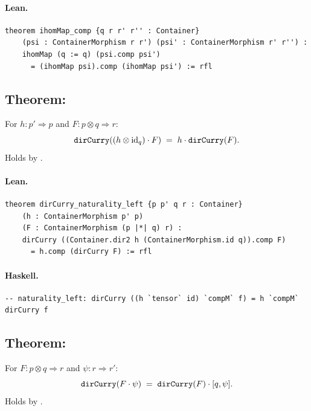 \documentclass[11pt,a4paper]{article}
\begin{document}
\paragraph{Lean.}
\begin{lstlisting}[style=lean]
theorem ihomMap_comp {q r r' r'' : Container}
    (psi : ContainerMorphism r r') (psi' : ContainerMorphism r' r'') :
    ihomMap (q := q) (psi.comp psi')
      = (ihomMap psi).comp (ihomMap psi') := rfl
\end{lstlisting}


\subsection{Theorem: }

\begin{thm}
For $h : p' \Rightarrow p$ and $F : p \otimes q \Rightarrow r$:
\[
  \texttt{dirCurry}((h \otimes \mathrm{id}_q) \cdot F)
  \;=\;
  h \cdot \texttt{dirCurry}(F).
\]
Holds by .
\end{thm}

\paragraph{Lean.}
\begin{lstlisting}[style=lean]
theorem dirCurry_naturality_left {p p' q r : Container}
    (h : ContainerMorphism p' p)
    (F : ContainerMorphism (p |*| q) r) :
    dirCurry ((Container.dir2 h (ContainerMorphism.id q)).comp F)
      = h.comp (dirCurry F) := rfl
\end{lstlisting}

\paragraph{Haskell.}
\begin{lstlisting}[style=haskell]
-- naturality_left: dirCurry ((h `tensor` id) `compM` f) = h `compM` dirCurry f
\end{lstlisting}


\subsection{Theorem: }

\begin{thm}
For $F : p \otimes q \Rightarrow r$ and $\psi : r \Rightarrow r'$:
\[
  \texttt{dirCurry}(F \cdot \psi)
  \;=\;
  \texttt{dirCurry}(F) \cdot [q, \psi].
\]
Holds by .
\end{thm}
\end{document}

